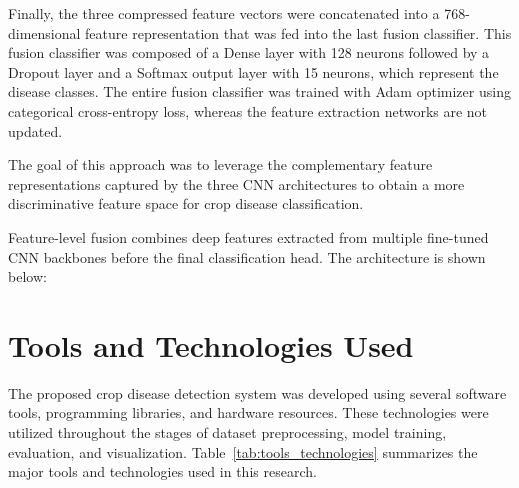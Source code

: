 Finally, the three compressed feature vectors were concatenated into a 768-dimensional feature representation that was fed into the last fusion classifier. This fusion classifier was composed of a Dense layer with 128 neurons followed by a Dropout layer and a Softmax output layer with 15 neurons, which represent the disease classes. The entire fusion classifier was trained with Adam optimizer using categorical cross-entropy loss, whereas the feature extraction networks are not updated.

The goal of this approach was to leverage the complementary feature representations captured by the three CNN architectures to obtain a more discriminative feature space for crop disease classification. 

Feature-level fusion combines deep features extracted from multiple fine-tuned CNN backbones before the final classification head. The architecture is shown below:









\section{Tools and Technologies Used}

The proposed crop disease detection system was developed using several software tools, programming libraries, and hardware resources. These technologies were utilized throughout the stages of dataset preprocessing, model training, evaluation, and visualization. Table~\ref{tab:tools_technologies} summarizes the major tools and technologies used in this research.

